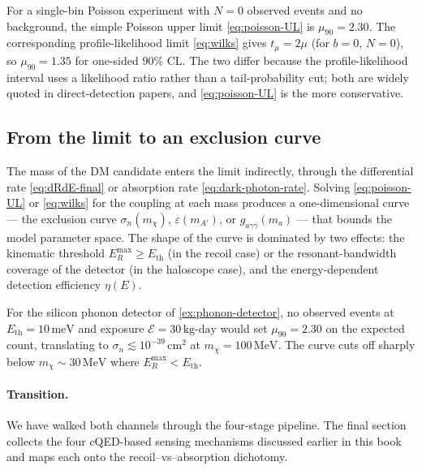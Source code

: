 \begin{example}
\label{ex:limits-compare}
For a single-bin Poisson experiment with $N=0$ observed events and
no background, the simple Poisson upper limit \cref{eq:poisson-UL}
is $\mu_{90}=2.30$. The corresponding profile-likelihood limit
\cref{eq:wilks} gives $t_\mu=2\mu$ (for $b=0$, $N=0$), so
$\mu_{90}=1.35$ for one-sided $90\%$ CL. The two differ because
the profile-likelihood interval uses a likelihood ratio rather
than a tail-probability cut; both are widely quoted in
direct-detection papers, and \cref{eq:poisson-UL} is the more
conservative.
\end{example}

\subsection{From the limit to an exclusion curve}
\label{sec:exclusion-curves}

The mass of the DM candidate enters the limit indirectly, through
the differential rate \cref{eq:dRdE-final} or absorption rate
\cref{eq:dark-photon-rate}. Solving \cref{eq:poisson-UL} or
\cref{eq:wilks} for the coupling at each mass produces a
one-dimensional curve --- the exclusion curve $\sigma_n(m_\chi)$,
$\varepsilon(m_{A'})$, or $g_{a\gamma\gamma}(m_a)$ --- that bounds
the model parameter space. The shape of the curve is dominated by
two effects: the kinematic threshold $E_R^\text{max}\geq E_\text{th}$
(in the recoil case) or the resonant-bandwidth coverage of the
detector (in the haloscope case), and the energy-dependent
detection efficiency $\eta(E)$.

\begin{example}
\label{ex:exclusion-sketch}
For the silicon phonon detector of \cref{ex:phonon-detector}, no
observed events at $E_\text{th}=10\,\text{meV}$ and exposure
$\mathcal E=30\,\text{kg-day}$ would set
$\mu_{90}=2.30$ on the expected count, translating to
$\sigma_n\lesssim 10^{-39}\,\text{cm}^2$ at $m_\chi=100\,\text{MeV}$.
The curve cuts off sharply below $m_\chi\sim 30\,\text{MeV}$ where
$E_R^\text{max}<E_\text{th}$.
\end{example}

\paragraph{Transition.}
We have walked both channels through the four-stage pipeline. The
final section collects the four cQED-based sensing mechanisms
discussed earlier in this book and maps each onto the
recoil--vs--absorption dichotomy.

